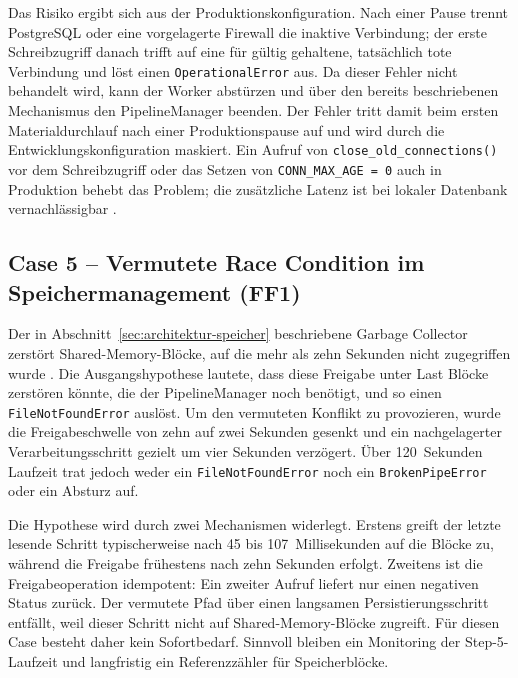 Das Risiko ergibt sich aus der Produktionskonfiguration. Nach einer Pause trennt
PostgreSQL oder eine vorgelagerte Firewall die inaktive Verbindung; der erste
Schreibzugriff danach trifft auf eine für gültig gehaltene, tatsächlich tote Verbindung
und löst einen \texttt{OperationalError} aus. Da dieser Fehler nicht behandelt wird, kann
der Worker abstürzen und über den bereits beschriebenen Mechanismus den PipelineManager
beenden. Der Fehler tritt damit beim ersten Materialdurchlauf nach einer Produktionspause
auf und wird durch die Entwicklungskonfiguration maskiert. Ein Aufruf von
\texttt{close\_old\_connections()} vor dem Schreibzugriff oder das Setzen von
\texttt{CONN\_\allowbreak{}MAX\_\allowbreak{}AGE = 0} auch in Produktion behebt das Problem;
die zusätzliche Latenz ist bei lokaler Datenbank vernachlässigbar
\cite{django_persistent_connections}.

\subsection[Case 5 -- Vermutete Race Condition im Speichermanagement]{Case 5 -- Vermutete Race Condition im Speichermanagement (FF1)}
\label{sec:case5}

Der in Abschnitt~\ref{sec:architektur-speicher} beschriebene Garbage Collector zerstört
Shared-Memory-Blöcke, auf die mehr als zehn Sekunden nicht zugegriffen wurde
\cite{python_shm}. Die Ausgangshypothese
lautete, dass diese Freigabe unter Last Blöcke zerstören könnte, die der PipelineManager
noch benötigt, und so einen \texttt{FileNotFoundError} auslöst. Um den vermuteten Konflikt
zu provozieren, wurde die Freigabeschwelle von zehn auf zwei Sekunden gesenkt und ein
nachgelagerter Verarbeitungsschritt gezielt um vier Sekunden verzögert. Über 120~Sekunden
Laufzeit trat jedoch weder ein \texttt{FileNotFoundError} noch ein \texttt{BrokenPipeError}
oder ein Absturz auf.

Die Hypothese wird durch zwei Mechanismen widerlegt. Erstens greift der letzte lesende
Schritt typischerweise nach 45 bis 107~Millisekunden auf die Blöcke zu, während die
Freigabe frühestens nach zehn Sekunden erfolgt. Zweitens ist die Freigabeoperation
idempotent: Ein zweiter Aufruf liefert nur einen negativen Status zurück. Der vermutete
Pfad über einen langsamen Persistierungsschritt entfällt, weil dieser Schritt nicht auf
Shared-Memory-Blöcke zugreift. Für diesen Case besteht daher kein Sofortbedarf. Sinnvoll
bleiben ein Monitoring der Step-5-Laufzeit und langfristig ein Referenzzähler für
Speicherblöcke.
